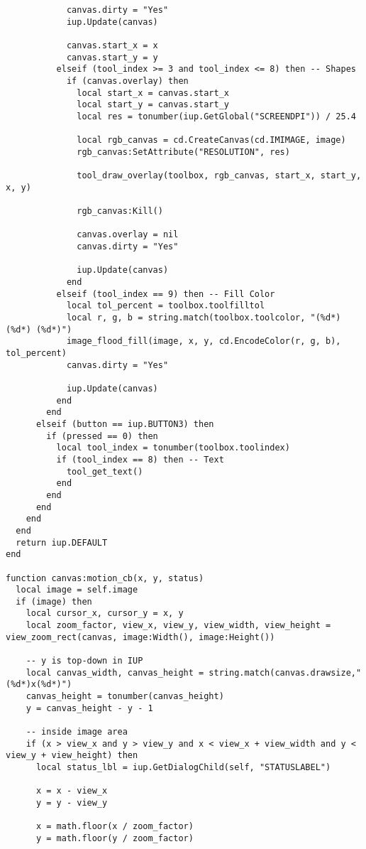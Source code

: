 \documentclass{ctexart}
\begin{document}
\begin{lstlisting}
            canvas.dirty = "Yes"
            iup.Update(canvas)
  
            canvas.start_x = x
            canvas.start_y = y
          elseif (tool_index >= 3 and tool_index <= 8) then -- Shapes
            if (canvas.overlay) then
              local start_x = canvas.start_x
              local start_y = canvas.start_y
              local res = tonumber(iup.GetGlobal("SCREENDPI")) / 25.4

              local rgb_canvas = cd.CreateCanvas(cd.IMIMAGE, image)
              rgb_canvas:SetAttribute("RESOLUTION", res)
              
              tool_draw_overlay(toolbox, rgb_canvas, start_x, start_y, x, y)
              
              rgb_canvas:Kill()
  
              canvas.overlay = nil
              canvas.dirty = "Yes"
  
              iup.Update(canvas)
            end
          elseif (tool_index == 9) then -- Fill Color
            local tol_percent = toolbox.toolfilltol
            local r, g, b = string.match(toolbox.toolcolor, "(%d*) (%d*) (%d*)")
            image_flood_fill(image, x, y, cd.EncodeColor(r, g, b), tol_percent)
            canvas.dirty = "Yes"
  
            iup.Update(canvas)
          end
        end
      elseif (button == iup.BUTTON3) then
        if (pressed == 0) then
          local tool_index = tonumber(toolbox.toolindex)
          if (tool_index == 8) then -- Text
            tool_get_text()
          end
        end
      end
    end
  end
  return iup.DEFAULT
end

function canvas:motion_cb(x, y, status)
  local image = self.image
  if (image) then
    local cursor_x, cursor_y = x, y
    local zoom_factor, view_x, view_y, view_width, view_height = view_zoom_rect(canvas, image:Width(), image:Height())

    -- y is top-down in IUP
    local canvas_width, canvas_height = string.match(canvas.drawsize,"(%d*)x(%d*)")
    canvas_height = tonumber(canvas_height)
    y = canvas_height - y - 1

    -- inside image area 
    if (x > view_x and y > view_y and x < view_x + view_width and y < view_y + view_height) then
      local status_lbl = iup.GetDialogChild(self, "STATUSLABEL")

      x = x - view_x
      y = y - view_y

      x = math.floor(x / zoom_factor)
      y = math.floor(y / zoom_factor)


\end{lstlisting}
\end{document}
